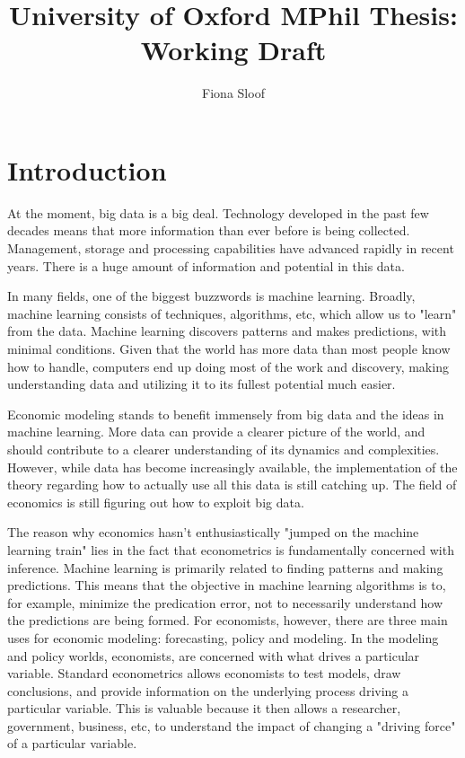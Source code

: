 \documentclass[11pt, oneside]{book}   	%
\title{University of Oxford MPhil Thesis: Working Draft}
\author{Fiona Sloof}
\begin{document}
\maketitle

\chapter{Introduction}

At the moment, big data is a big deal. Technology developed in the past few decades means that more information than ever before is being collected. Management, storage and processing capabilities have advanced rapidly in recent years. There is a huge amount of information and potential in this data. 

In many fields, one of the biggest buzzwords is machine learning. Broadly, machine learning consists of techniques, algorithms, etc, which allow us to "learn" from the data. Machine learning discovers patterns and makes predictions, with minimal conditions. Given that the world has more data than most people know how to handle, computers end up doing most of the work and discovery, making understanding data and utilizing it to its fullest potential much easier.

Economic modeling stands to benefit immensely from big data and the ideas in machine learning. More data can provide a clearer picture of the world, and should contribute to a clearer understanding of its dynamics and complexities. However, while data has become increasingly available, the implementation of the theory regarding how to actually use all this data is still catching up. The field of economics is still figuring out how to exploit big data. 

The reason why economics hasn't enthusiastically "jumped on the machine learning train" lies in the fact that econometrics is fundamentally concerned with inference. Machine learning is primarily related to finding patterns and making predictions. This means that the objective in machine learning algorithms is to, for example, minimize the predication error, not to necessarily understand how the predictions are being formed. For economists, however, there are three main uses for economic modeling: forecasting, policy and modeling. In the modeling and policy worlds, economists, are concerned with what drives a particular variable. Standard econometrics allows economists to test models, draw conclusions, and provide information on the underlying process driving a particular variable. This is valuable because it then allows a researcher, government, business, etc, to understand the impact of changing a "driving force" of a particular variable. 
\end{document}
